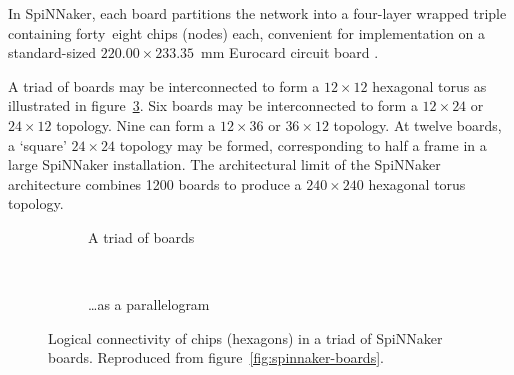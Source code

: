 		In SpiNNaker, each board partitions the network into a four-layer wrapped
		triple containing forty~eight chips (nodes) each, convenient for
		implementation on a standard-sized $220.00\times233.35$~\si{\milli\meter}
		Eurocard circuit board \cite{ieee11011}.
		
		A triad of boards may be interconnected to form a $12\times12$ hexagonal
		torus as illustrated in figure~\ref{fig:threeboard-apdx}. Six boards may be
		interconnected to form a $12\times24$ or $24\times12$ topology. Nine can
		form a $12\times36$ or $36\times12$ topology. At twelve boards, a `square'
		$24\times24$ topology may be formed, corresponding to half a frame in a
		large SpiNNaker installation. The architectural limit of the SpiNNaker
		architecture combines \num{1200} boards to produce a $240\times240$
		hexagonal torus topology.
		
		\begin{figure}
			\center
			\begin{subfigure}[b]{0.45\linewidth}
				\center
				
				\caption{A triad of boards}
				\label{fig:threeboard-separate-apdx}
			\end{subfigure}
			~~~
			\begin{subfigure}[b]{0.45\linewidth}
				\center
				
				\caption{\ldots{}as a parallelogram}
				\label{fig:threeboard-wrapped-apdx}
			\end{subfigure}
			
			\caption[Logical connectivity of chips in a triad of SpiNNaker boards.]%
			{Logical connectivity of chips (hexagons) in a triad of SpiNNaker
			boards. Reproduced from figure~\ref{fig:spinnaker-boards}.}
			\label{fig:threeboard-apdx}
		\end{figure}

